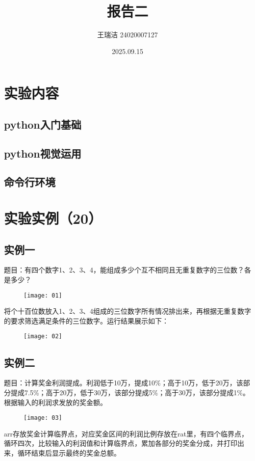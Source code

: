 \documentclass[12pt,letterpaper]{article}
\title{报告二}
\author{王瑞洁 24020007127}
\date{2025.09.15}
\begin{document}
\maketitle
\section{实验内容}
\subsection{python入门基础}
\subsection{python视觉运用}
\subsection{命令行环境}
\vspace{1em}  %

\section{实验实例（20）}

\subsection{实例一}
题目：有四个数字1、2、3、4，能组成多少个互不相同且无重复数字的三位数？各是多少？
\begin{figure}[H]
\centering
\texttt{[image: 01]}
\end{figure}
将个十百位数放入1、2、3、4组成的三位数字所有情况排出来，再根据无重复数字的要求筛选满足条件的三位数字。运行结果展示如下：
\begin{figure}[H]
\centering
\texttt{[image: 02]}
\end{figure}

\subsection{实例二}
题目：计算奖金利润提成。利润低于10万，提成10\%；高于10万，低于20万，该部分提成7.5\%；高于20万，低于30万，该部分提成5\%；高于30万，该部分提成1\%。根据输入的利润求发放的奖金额。
\begin{figure}[H]
\centering
\texttt{[image: 03]}
\end{figure}
arr存放奖金计算临界点，对应奖金区间的利润比例存放在rat里，有四个临界点，循环四次，比较输入的利润值和计算临界点，累加各部分的奖金分成，并打印出来，循环结束后显示最终的奖金总额。
\end{document}
